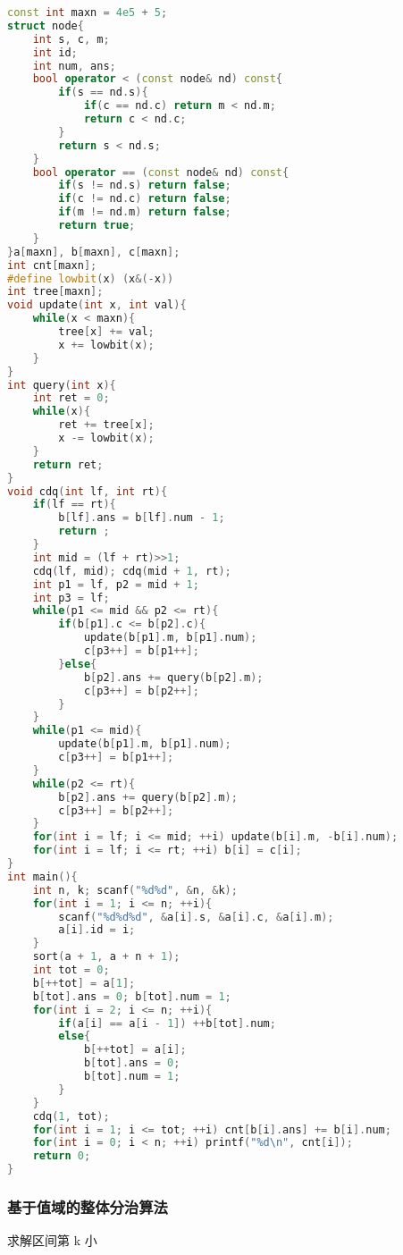 \begin{lstlisting}[language=C++]
const int maxn = 4e5 + 5;
struct node{
    int s, c, m;
    int id;
    int num, ans;
    bool operator < (const node& nd) const{
        if(s == nd.s){
            if(c == nd.c) return m < nd.m;
            return c < nd.c;
        }
        return s < nd.s;
    }
    bool operator == (const node& nd) const{
        if(s != nd.s) return false;
        if(c != nd.c) return false;
        if(m != nd.m) return false;
        return true;
    }
}a[maxn], b[maxn], c[maxn];
int cnt[maxn];
#define lowbit(x) (x&(-x))
int tree[maxn];
void update(int x, int val){
    while(x < maxn){
        tree[x] += val;
        x += lowbit(x);
    }
}
int query(int x){
    int ret = 0;
    while(x){
        ret += tree[x];
        x -= lowbit(x);
    }
    return ret;
}
void cdq(int lf, int rt){
    if(lf == rt){
        b[lf].ans = b[lf].num - 1;
        return ;
    }
    int mid = (lf + rt)>>1;
    cdq(lf, mid); cdq(mid + 1, rt);
    int p1 = lf, p2 = mid + 1;
    int p3 = lf;
    while(p1 <= mid && p2 <= rt){
        if(b[p1].c <= b[p2].c){
            update(b[p1].m, b[p1].num);
            c[p3++] = b[p1++];
        }else{
            b[p2].ans += query(b[p2].m);
            c[p3++] = b[p2++];
        }
    }
    while(p1 <= mid){
        update(b[p1].m, b[p1].num);
        c[p3++] = b[p1++];
    }
    while(p2 <= rt){
        b[p2].ans += query(b[p2].m);
        c[p3++] = b[p2++];
    }
    for(int i = lf; i <= mid; ++i) update(b[i].m, -b[i].num);
    for(int i = lf; i <= rt; ++i) b[i] = c[i];
}
int main(){
    int n, k; scanf("%d%d", &n, &k);
    for(int i = 1; i <= n; ++i){
        scanf("%d%d%d", &a[i].s, &a[i].c, &a[i].m);
        a[i].id = i;
    }
    sort(a + 1, a + n + 1);
    int tot = 0;
    b[++tot] = a[1];
    b[tot].ans = 0; b[tot].num = 1;
    for(int i = 2; i <= n; ++i){
        if(a[i] == a[i - 1]) ++b[tot].num;
        else{
            b[++tot] = a[i];
            b[tot].ans = 0;
            b[tot].num = 1;
        }
    }
    cdq(1, tot);
    for(int i = 1; i <= tot; ++i) cnt[b[i].ans] += b[i].num;
    for(int i = 0; i < n; ++i) printf("%d\n", cnt[i]);
    return 0;
}
\end{lstlisting}

\subsubsection{基于值域的整体分治算法}

求解区间第 k 小

